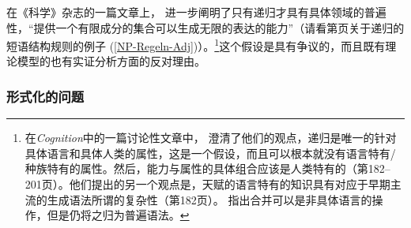 在《科学》杂志的一篇文章上， \citet*{HCF2002a}进一步阐明了只有递归才具有具体领域的普遍性，“提供一个有限成分的集合可以生成无限的表达的能力”（请看第\pageref{NP-Regeln-Adj}页关于递归的短语结构规则的例子 (\ref{NP-Regeln-Adj})）。\footnote{%
在\emph{Cognition}中的一篇讨论性文章中， \citet*{FHC2005a}澄清了他们的观点，递归是唯一的针对具体语言和具体人类的属性，这是一个假设，而且可以根本就没有语言特有/种族特有的属性。然后，能力与属性的具体组合应该是人类特有的（第182--201页）。他们提出的另一个观点是，天赋的语言特有的知识具有对应于早期主流的生成语法所谓的复杂性（第182页）。
 \citet[]{Chomsky2007a}指出合并可以是非具体语言的操作，但是仍将之归为普遍语法。
}这个假设是具有争议的，而且既有理论模型的也有实证分析方面的反对理由。
%

\subsubsection{形式化的问题}

